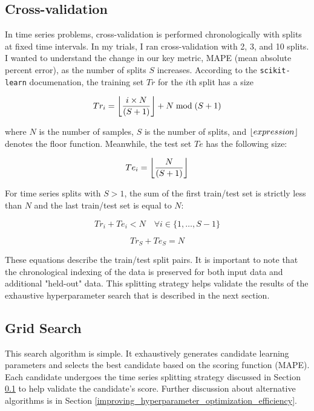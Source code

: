 \documentclass[11pt, oneside]{article}
\DeclarePairedDelimiter{\floor}{\lfloor}{\rfloor}
\begin{document}
\subsection{Cross-validation}
\label{cross_validation}
In time series problems, cross-validation is performed chronologically with splits at fixed time intervals. In my trials, I ran cross-validation with 2, 3, and 10 splits. I wanted to understand the change in our key metric, MAPE (mean absolute percent error), as the number of splits $S$ increases. According to the \texttt{scikit-learn} documenation, the training set $Tr$ for the $i$th split has a size

\begin{equation}
  \label{eq:3}
  Tr_{i} = \floor*{\frac{i \times N}{(S + 1)}} + N \bmod (S + 1)
\end{equation}

where $N$ is the number of samples, $S$ is the number of splits, and $\floor{expression}$ denotes the floor function. Meanwhile, the test set $Te$ has the following size:

\begin{equation}
  \label{eq:4}
  Te_{i} = \floor*{\frac{N}{(S + 1)}}
\end{equation}

For time series splits with $S>1$, the sum of the first train/test set is strictly less than $N$ and the last train/test set is equal to $N$:

\begin{equation}
  \label{eq:5}
  Tr_{i} + Te_{i} < N \quad \forall i \in \{1, \dots, S-1\}
\end{equation}

\begin{equation}
  \label{eq:6}
  Tr_{S} + Te_{S} = N
\end{equation}

These equations describe the train/test split pairs. It is important to note that the chronological indexing of the data is preserved for both input data and additional "held-out" data. This splitting strategy helps validate the results of the exhaustive hyperparameter search that is described in the next section.
\subsection{Grid Search}
This search algorithm is simple. It exhaustively generates candidate learning parameters and selects the best candidate based on the scoring function (MAPE). Each candidate undergoes the time series splitting strategy discussed in Section \ref{cross_validation} to help validate the candidate's score. Further discussion about alternative algorithms is in Section \ref{improving_hyperparameter_optimization_efficiency}.
\end{document}
